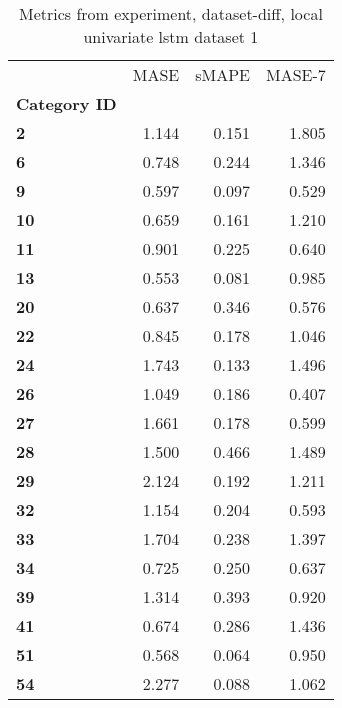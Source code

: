 \begin{table}[h]
\centering
\caption{Metrics from experiment, dataset-diff, local univariate lstm dataset 1}
\label{table:local-univariate-lstm-dataset-1-dataset-diff}
\begin{tabular}{lrrr}
\toprule
{} &   MASE &  sMAPE &  MASE-7 \\
\textbf{Category ID} &        &        &         \\
\midrule
\textbf{2          } &  1.144 &  0.151 &   1.805 \\
\textbf{6          } &  0.748 &  0.244 &   1.346 \\
\textbf{9          } &  0.597 &  0.097 &   0.529 \\
\textbf{10         } &  0.659 &  0.161 &   1.210 \\
\textbf{11         } &  0.901 &  0.225 &   0.640 \\
\textbf{13         } &  0.553 &  0.081 &   0.985 \\
\textbf{20         } &  0.637 &  0.346 &   0.576 \\
\textbf{22         } &  0.845 &  0.178 &   1.046 \\
\textbf{24         } &  1.743 &  0.133 &   1.496 \\
\textbf{26         } &  1.049 &  0.186 &   0.407 \\
\textbf{27         } &  1.661 &  0.178 &   0.599 \\
\textbf{28         } &  1.500 &  0.466 &   1.489 \\
\textbf{29         } &  2.124 &  0.192 &   1.211 \\
\textbf{32         } &  1.154 &  0.204 &   0.593 \\
\textbf{33         } &  1.704 &  0.238 &   1.397 \\
\textbf{34         } &  0.725 &  0.250 &   0.637 \\
\textbf{39         } &  1.314 &  0.393 &   0.920 \\
\textbf{41         } &  0.674 &  0.286 &   1.436 \\
\textbf{51         } &  0.568 &  0.064 &   0.950 \\
\textbf{54         } &  2.277 &  0.088 &   1.062 \\
\bottomrule
\end{tabular}
\end{table}
